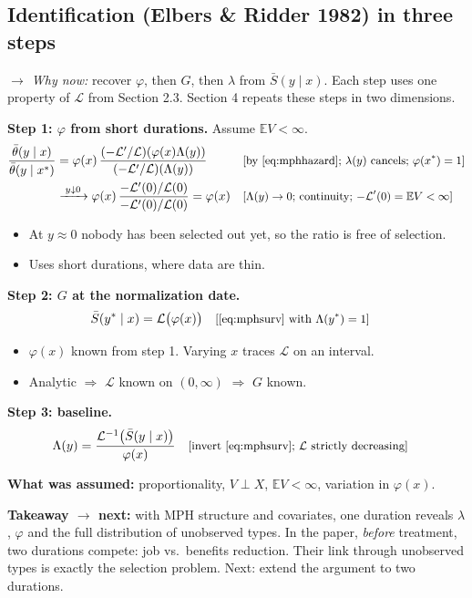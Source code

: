 \documentclass[11pt]{article}
\newcommand{\E}{\mathbb{E}}
\newcommand{\1}{\mathbf{1}}
\newcommand{\Lap}{\mathcal{L}}
\newcommand{\why}[1]{\text{\small[#1]}}
\newcommand{\whynow}[1]{\par\noindent\textit{$\rightarrow$ Why now:} #1\par}
\newcommand{\takeaway}[1]{\par\noindent\textbf{Takeaway $\rightarrow$ next:} #1\par}
\begin{document}
\subsection{Identification (Elbers \& Ridder 1982) in three steps}
\whynow{recover $\varphi$, then $G$, then $\lambda$ from $\bar S(y\mid x)$. Each step uses one property of $\Lap$ from Section 2.3. Section 4 repeats these steps in two dimensions.}
\textbf{Step 1: $\varphi$ from short durations.} Assume $\E V<\infty$.
\begin{align}
  \frac{\bar\theta(y\mid x)}{\bar\theta(y\mid x^*)}
  &= \varphi(x)\,\frac{(-\Lap'/\Lap)(\varphi(x)\Lambda(y))}{(-\Lap'/\Lap)(\Lambda(y))} && \why{by \eqref{eq:mphhazard}; $\lambda(y)$ cancels; $\varphi(x^*)=1$} \nonumber\\
  &\xrightarrow{\;y\downarrow0\;} \varphi(x)\,\frac{-\Lap'(0)/\Lap(0)}{-\Lap'(0)/\Lap(0)} = \varphi(x) && \why{$\Lambda(y)\to0$; continuity; $-\Lap'(0)=\E V<\infty$} \nonumber
\end{align}
\begin{itemize}
  \item At $y\approx0$ nobody has been selected out yet, so the ratio is free of selection.
  \item Uses short durations, where data are thin.
\end{itemize}

\textbf{Step 2: $G$ at the normalization date.}
\begin{align}
  \bar S(y^*\mid x) &= \Lap\big(\varphi(x)\big) && \why{\eqref{eq:mphsurv} with $\Lambda(y^*)=1$} \nonumber
\end{align}
\begin{itemize}
  \item $\varphi(x)$ known from step 1. Varying $x$ traces $\Lap$ on an interval.
  \item Analytic $\Rightarrow$ $\Lap$ known on $(0,\infty)$ $\Rightarrow$ $G$ known.
\end{itemize}

\textbf{Step 3: baseline.}
\begin{align}
  \Lambda(y) &= \frac{\Lap^{-1}\big(\bar S(y\mid x)\big)}{\varphi(x)} && \why{invert \eqref{eq:mphsurv}; $\Lap$ strictly decreasing} \nonumber
\end{align}

\textbf{What was assumed:} proportionality, $V\perp X$, $\E V<\infty$, variation in $\varphi(x)$.

\takeaway{with MPH structure and covariates, one duration reveals $\lambda$, $\varphi$ and the full distribution of unobserved types. In the paper, \emph{before} treatment, two durations compete: job vs.\ benefits reduction. Their link through unobserved types is exactly the selection problem. Next: extend the argument to two durations.}
\end{document}
